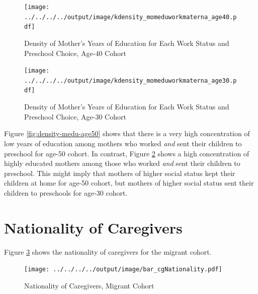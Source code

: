 \documentclass[12pt]{article}
\begin{document}
\begin{figure}[H] \caption{Density of Mother's Years of Education for Each Work Status and Preschool Choice, Age-40 Cohort} \label{fig:density-medu-age40}
\centering
\texttt{[image: ../../../../output/image/kdensity\_momeduworkmaterna\_age40.pdf]}
\end{figure}


\begin{figure}[H] \caption{Density of Mother's Years of Education for Each Work Status and Preschool Choice, Age-30 Cohort} \label{fig:density-medu-age30}
\centering
\texttt{[image: ../../../../output/image/kdensity\_momeduworkmaterna\_age30.pdf]}
\end{figure}


Figure \ref{fig:density-medu-age50} shows that there is a very high concentration of low years of education among mothers who worked \textit{and} sent their children to preschool for age-50 cohort. In contrast, Figure \ref{fig:density-medu-age30} shows a high concentration of highly educated mothers among those who worked \textit{and} sent their children to preschool. This might imply that mothers of higher social status kept their children at home for age-50 cohort, but mothers of higher social status sent their children to preschools for age-30 cohort. 

\section{Nationality of Caregivers}

Figure \ref{fig:cg-nationality} shows the nationality of caregivers for the migrant cohort.

\begin{figure}[H] \caption{Nationality of Caregivers, Migrant Cohort} \label{fig:cg-nationality}
\centering
\texttt{[image: ../../../../output/image/bar\_cgNationality.pdf]}
\end{figure}
\end{document}
